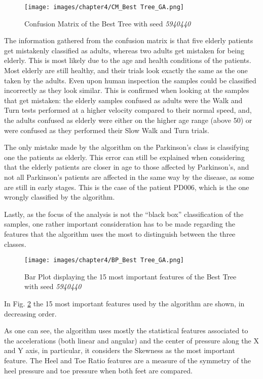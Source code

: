 \begin{figure}[h!]
    \centering
    \texttt{[image: images/chapter4/CM\_Best Tree\_GA.png]}
    \caption{Confusion Matrix of the Best Tree with seed  \textit{5940440}}
    \label{fig:CM_Best Tree_GA}
\end{figure}

The information gathered from the confusion matrix is that five elderly patients get mistakenly classified as adults, whereas two adults get mistaken for being elderly. This is most likely due to the age and health conditions of the patients. Most elderly are still healthy, and their trials look exactly the same as the one taken by the adults. Even upon human inspection the samples could be classified incorrectly as they look similar. This is 
confirmed when looking at the samples that get mistaken: the elderly samples confused as adults were the Walk and Turn tests performed at a higher velocity compared to their normal speed, and, the adults confused as elderly were either on the higher age range (above 50) or were confused as they performed their Slow Walk and Turn trials.


The only mistake made by the algorithm on the Parkinson's class is classifying one the patients as elderly. This error can still be explained when considering that the elderly patients are closer in age to those affected by Parkinson's, and not all Parkinson's patients are affected in the same way by the disease, as some are still in early stages. This is the case of the patient PD006, which is the one wrongly classified by the algorithm.


Lastly, as the focus of the analysis is not the \enquote{black box} classification of the samples, one rather important consideration has to be made regarding the features that the algorithm uses the most to distinguish between the three classes.

\begin{figure}[h!]
    \centering
    \texttt{[image: images/chapter4/BP\_Best Tree\_GA.png]}
    \caption{Bar Plot displaying the 15 most important features of the Best Tree with seed  \textit{5940440}}
    \label{fig:BP_Best Tree_GA}
\end{figure}


In Fig. \ref{fig:BP_Best Tree_GA} the 15 most important features used by the algorithm are shown, in decreasing order.

As one can see, the algorithm uses mostly the statistical features associated to the accelerations (both linear and angular) and the center of pressure along the X and Y axis, in particular, it considers the Skewness as the most important feature.
The Heel and Toe Ratio features are a measure of the symmetry of the heel pressure and toe pressure when both feet are compared.


